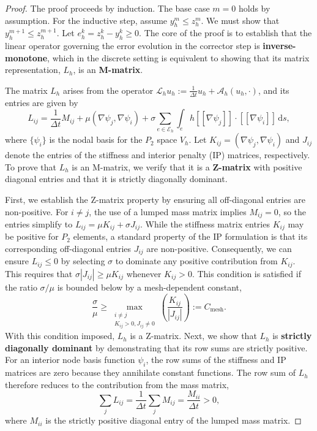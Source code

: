 \documentclass[pdflatex,sn-mathphys-num]{sn-jnl}%
\theoremstyle{thmstyleone}%
\numberwithin{equation}{section}
\newcommand{\inner}[2]{\left( #1, #2 \right)}
\begin{document}
\begin{proof}
The proof proceeds by induction. The base case $m=0$ holds by assumption. For the inductive step, assume $y_h^m \le z_h^m$. We must show that $y_h^{m+1} \le z_h^{m+1}$. Let $e_h^k = z_h^k - y_h^k \ge 0$. The core of the proof is to establish that the linear operator governing the error evolution in the corrector step is \textbf{inverse-monotone}, which in the discrete setting is equivalent to showing that its matrix representation, $L_h$, is an \textbf{M-matrix}.

The matrix $L_h$ arises from the operator $\mathcal{L}_h u_h := \frac{1}{\Delta t} u_h + \mathcal{A}_h(u_h, \cdot)$, and its entries are given by
$$L_{ij} = \frac{1}{\Delta t} M_{ij} + \mu \inner{\nabla \psi_j}{\nabla \psi_i} + \sigma \sum_{e \in \mathcal{E}_h} \int_e h [\![ \nabla \psi_j ]\!] \cdot [\![ \nabla \psi_i ]\!] \, \mathrm{d}s,$$
where $\{\psi_i\}$ is the nodal basis for the $P_2$ space $V_h$. Let $K_{ij} = \inner{\nabla \psi_j}{\nabla \psi_i}$ and $J_{ij}$ denote the entries of the stiffness and interior penalty (IP) matrices, respectively. To prove that $L_h$ is an M-matrix, we verify that it is a \textbf{Z-matrix} with positive diagonal entries and that it is strictly diagonally dominant.

First, we establish the Z-matrix property by ensuring all off-diagonal entries are non-positive. For $i \neq j$, the use of a lumped mass matrix implies $M_{ij}=0$, so the entries simplify to $L_{ij} = \mu K_{ij} + \sigma J_{ij}$. While the stiffness matrix entries $K_{ij}$ may be positive for $P_2$ elements, a standard property of the IP formulation is that its corresponding off-diagonal entries $J_{ij}$ are non-positive. Consequently, we can ensure $L_{ij} \le 0$ by selecting $\sigma$ to dominate any positive contribution from $K_{ij}$. This requires that $\sigma |J_{ij}| \ge \mu K_{ij}$ whenever $K_{ij} > 0$. This condition is satisfied if the ratio $\sigma/\mu$ is bounded below by a mesh-dependent constant,
$$\frac{\sigma}{\mu} \ge \max_{\substack{i \neq j \\ K_{ij} > 0, J_{ij} \neq 0}} \left( \frac{K_{ij}}{|J_{ij}|} \right) := C_{\text{mesh}}.$$
With this condition imposed, $L_h$ is a Z-matrix. Next, we show that $L_h$ is \textbf{strictly diagonally dominant} by demonstrating that its row sums are strictly positive. For an interior node basis function $\psi_i$, the row sums of the stiffness and IP matrices are zero because they annihilate constant functions. The row sum of $L_h$ therefore reduces to the contribution from the mass matrix,
$$\sum_{j} L_{ij} = \frac{1}{\Delta t} \sum_{j} M_{ij} = \frac{M_{ii}}{\Delta t} > 0,$$
where $M_{ii}$ is the strictly positive diagonal entry of the lumped mass matrix.


\end{proof}
\end{document}

